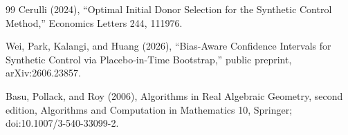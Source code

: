 \documentclass{article}
\begin{document}
\begin{thebibliography}{99}
   Cerulli (2024), ``Optimal Initial Donor Selection for the Synthetic Control Method,'' Economics Letters 244, 111976.

   Wei, Park, Kalangi, and Huang (2026), ``Bias-Aware Confidence Intervals for Synthetic Control via Placebo-in-Time Bootstrap,'' public preprint, arXiv:2606.23857.

   Basu, Pollack, and Roy (2006), Algorithms in Real Algebraic Geometry, second edition, Algorithms and Computation in Mathematics 10, Springer; doi:10.1007/3-540-33099-2.

\end{thebibliography}
\end{document}
